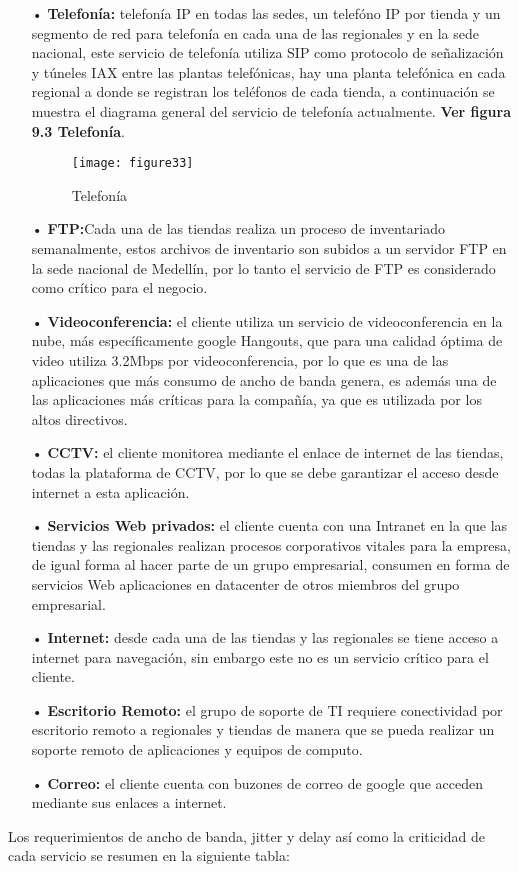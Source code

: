 \begin{itemize}
\item[•]\textbf{Telefonía:} telefonía IP en todas las sedes, un telefóno IP por tienda y un segmento de red para telefonía en cada una de las regionales y en la sede nacional, este servicio de telefonía utiliza SIP como protocolo de señalización y túneles IAX entre las plantas telefónicas, hay una planta telefónica en cada regional a donde se registran los teléfonos de cada tienda, a continuación se muestra el diagrama general del servicio de telefonía actualmente. \textbf{Ver figura 9.3 Telefonía}.
\begin{figure}[htbp]
  \centering
    {\texttt{[image: figure33]}}%
  \caption{Telefonía}
  \label{fig:fig2subfig}
\end{figure}

\item[•]\textbf{FTP:}Cada una de las tiendas realiza un proceso de inventariado semanalmente, estos archivos de inventario son subidos a un servidor FTP en la sede nacional de Medellín, por lo tanto el servicio de FTP es considerado como crítico para el negocio.
\item[•]\textbf{Videoconferencia:} el cliente utiliza un servicio de videoconferencia en la nube, más específicamente google Hangouts, que para una calidad óptima de video utiliza 3.2Mbps por videoconferencia, por lo que es una de las aplicaciones que más consumo de ancho de banda genera, es además una de las aplicaciones más críticas para la compañía, ya que es utilizada por los altos directivos.
\item[•]\textbf{CCTV:} el cliente monitorea mediante el enlace de internet de las tiendas, todas la plataforma de CCTV, por lo que se debe garantizar el acceso desde internet a esta aplicación.
\item[•]\textbf{Servicios Web privados:} el cliente cuenta con una Intranet en la que las tiendas y las regionales realizan procesos corporativos vitales para la empresa, de igual forma al hacer parte de un grupo empresarial, consumen en forma de servicios Web aplicaciones en datacenter de otros miembros del grupo empresarial.
\item[•]\textbf{Internet:} desde cada una de las tiendas y las regionales se tiene acceso a internet para navegación, sin embargo este no es un servicio crítico para el cliente.

\item[•]\textbf{Escritorio Remoto:} el grupo de soporte de TI requiere conectividad por escritorio remoto a regionales y tiendas de manera que se pueda realizar un soporte remoto de aplicaciones y equipos de computo.

\item[•]\textbf{Correo:} el cliente cuenta con buzones de correo de google que acceden mediante sus enlaces a internet.
\end{itemize}
Los requerimientos de ancho de banda, jitter y delay así como la criticidad de cada servicio se resumen en la siguiente tabla:

